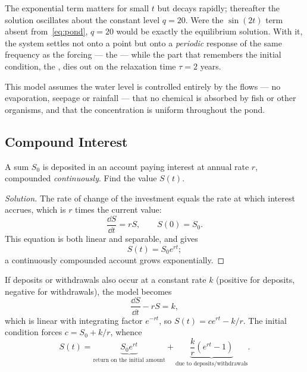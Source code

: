 \begin{observation}
	The exponential term matters for small \(t\) but decays rapidly; thereafter the
	solution oscillates about the constant level \(q = 20\). Were the \(\sin(2t)\) term
	absent from~\eqref{eq:pond}, \(q = 20\) would be exactly the equilibrium solution.
	With it, the system settles not onto a point but onto a \emph{periodic} response
	of the same frequency as the forcing --- the  --- while the part
	that remembers the initial condition, the , dies out on the
	relaxation time \(\tau = 2\) years.
\end{observation}

\begin{remark}
	This model assumes the water level is controlled entirely by the flows --- no
	evaporation, seepage or rainfall --- that no chemical is absorbed by fish or other
	organisms, and that the concentration is uniform throughout the pond.
\end{remark}

\subsection{Compound Interest}

\begin{eg}
	A sum \(S_0\) is deposited in an account paying interest at annual rate \(r\),
	compounded \emph{continuously}. Find the value \(S(t)\).
\end{eg}

\begin{proof}[Solution]
	The rate of change of the investment equals the rate at which interest accrues, which
	is \(r\) times the current value:
	\[
		\frac{\dd S}{\dd t} = rS, \qquad S(0) = S_0.
	\]
	This equation is both linear and separable, and gives
	\[
		S(t) = S_0 e^{rt};
	\]
	a continuously compounded account grows exponentially.
\end{proof}

If deposits or withdrawals also occur at a constant rate \(k\) (positive for deposits,
negative for withdrawals), the model becomes
\begin{equation}\label{eq:interest-k}
	\frac{\dd S}{\dd t} - rS = k,
\end{equation}
which is linear with integrating factor \(e^{-rt}\), so \(S(t) = ce^{rt} - k/r\). The
initial condition forces \(c = S_0 + k/r\), whence
\begin{equation}\label{eq:interest-sol}
	S(t) = \underbrace{S_0 e^{rt}}_{\text{return on the initial amount}}
	+ \underbrace{\frac{k}{r}\left( e^{rt} - 1 \right)}_{\text{due to deposits/withdrawals}}.
\end{equation}


